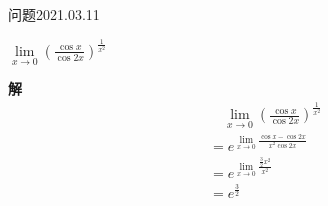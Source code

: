 \begin{mybox}{问题2021.03.11}
	
	\qquad $\lim\limits_{x \to 0}(\frac{\cos x}{\cos 2x})^{\frac{1}{x^2}}$
\end{mybox}
\noindent
\textbf{解}
\begin{align*}
	&\quad\lim\limits_{x \to 0}(\frac{\cos x}{\cos 2x})^{\frac{1}{x^2}}\\
	&=e^{\lim \limits_{x\to 0} \frac{\cos x-\cos 2x}{x^2\cos{2x}}}\\
	&=e^{\lim \limits_{x\to 0} \frac{\frac{3}{2}x^2}{x^2}}\\
	&=e^{\frac{3}{2}}
\end{align*}